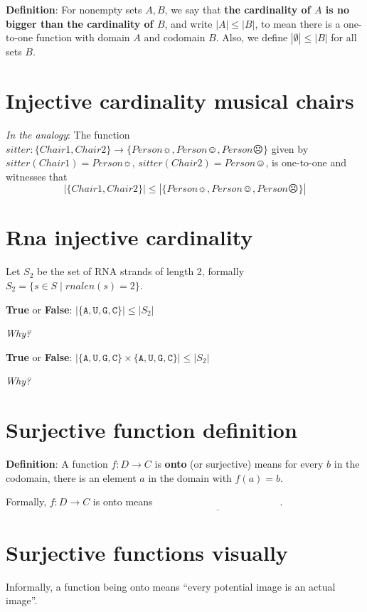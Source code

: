 \documentclass[12pt, oneside]{article}
\newcommand{\A}[0]{\texttt{A}}
\newcommand{\C}[0]{\texttt{C}}
\newcommand{\G}[0]{\texttt{G}}
\newcommand{\U}[0]{\texttt{U}}
\begin{document}
{\bf Definition}:  For nonempty sets $A, B$, we say that {\bf the  cardinality of $A$ is  no  bigger than the cardinality of $B$}, 
and write $|A| \leq |B|$, to mean there is a  one-to-one function  with domain $A$  and codomain $B$.
Also, we define $|\emptyset| \leq |B|$ for all sets $B$. \vfill
\section*{Injective cardinality musical chairs}


{\it In the analogy}: The function $sitter: \{ Chair1, Chair2\} \to \{ Person\sun, Person\smiley, Person\frownie \}$ given
by $sitter(Chair1) = Person\sun$,  $sitter(Chair2) = Person\smiley$, is one-to-one and witnesses that 
\[
| \{ Chair1, Chair2\} | \leq |\{ Person\sun, Person\smiley, Person\frownie \}|
\] \vfill
\section*{Rna injective cardinality}


Let $S_2$ be the set of RNA strands of length 2, formally $S_2 = \{ s \in S \mid rnalen(s) = 2\}$.

{\bf True} or {\bf False}: $| \{\A,\U,\G,\C\} | \leq |S_2 |$ 

{\it Why?}
\vspace{80pt}

{\bf True} or {\bf False}: $| \{\A,\U,\G,\C\} \times \{\A, \U, \G,\C\} | \leq |S_2 |$

{\it Why?}
\vspace{80pt}
 \vfill
\section*{Surjective function definition}


{\bf Definition}: A function $f: D  \to C$ is {\bf onto} (or  surjective) means for every $b$ in the codomain, 
there  is an element $a$ in the domain with  $f(a) = b$.

Formally, $f: D  \to  C$ is  onto  means $\underline{\phantom{\forall b \in C  \exists a \in D ( f(a) = b)}}$.
 \vfill
\section*{Surjective functions visually}


Informally, a function being onto means ``every potential image is an actual image''.

\phantom{Draw finite domain, finite codomain picture with duplicate image.}
\vspace{50pt} \vfill
\end{document}
